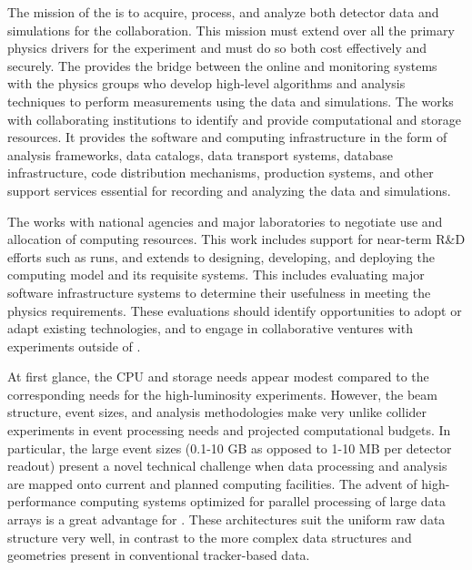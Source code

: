 The mission of the  %
 is to acquire, process, and analyze both detector data and  simulations for the %
collaboration.  This mission must extend over all the primary physics drivers for the experiment and must do so both cost effectively and securely. The  provides the bridge between the online  and monitoring systems with the physics groups who develop high-level algorithms and analysis techniques to perform measurements using the   data and simulations. The  works with collaborating institutions to identify and provide computational and storage resources.  %
It provides the software and computing infrastructure in the form of analysis frameworks, data catalogs, data transport systems, database infrastructure, code distribution mechanisms, production systems, and other support services essential for recording and analyzing the data and simulations. 

The  works with national agencies and major laboratories to negotiate use and allocation of computing resources.  This work includes support for near-term R\&D efforts %
such as  runs, and extends to designing, developing, and deploying the  computing model and its requisite systems. 
This includes evaluating major software infrastructure systems to determine their usefulness %
in meeting the  physics requirements.  These evaluations should identify opportunities to adopt or adapt existing technologies, and to engage in collaborative ventures with  experiments outside of . 


At first glance,  the  CPU and storage needs %
appear modest %
compared to the corresponding needs for the high-luminosity  experiments.  
However, the  beam structure, event sizes, and analysis methodologies make  very unlike collider experiments %
in event processing needs and projected computational budgets. 
In particular, the large  event sizes (0.1-10 GB as opposed to 1-10 MB per detector readout) present a novel technical challenge when data processing and analysis are mapped onto  current and planned computing facilities. 
The advent of high-performance computing systems optimized for parallel processing of large data arrays is a great advantage for . These architectures suit the uniform   raw data structure very well, in contrast to the more complex data structures and geometries present in conventional tracker-based  data. 


